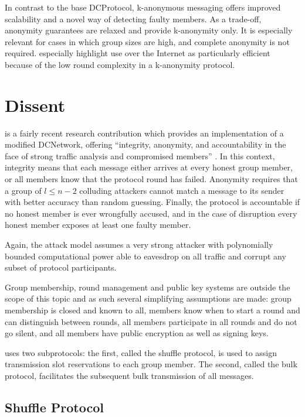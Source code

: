 In contrast to the base \ac{DCProtocol}, k-anonymous messaging offers improved scalability and
a novel way of detecting faulty members. As a trade-off, anonymity guarantees are relaxed
and provide k-anonymity only. It is especially relevant for cases in which group sizes are high,
and complete anonymity is not required. \citeauthor{von2003k} especially highlight use over the
Internet as particularly efficient because of the low round complexity in a k-anonymity protocol.

\section{Dissent} \label{sec:dissent}

\Dissent is a fairly recent research contribution which provides an implementation of a modified \ac{DCNetwork},
offering ``integrity, anonymity, and accountability in the face of strong traffic analysis and compromised members'' \cite{journals/corr/abs-1004-3057}. In this context, integrity means that each message either
arrives at every honest group member, or all members know that the protocol round has failed. Anonymity
requires that a group of $l \leq n - 2$ colluding attackers cannot match a message to its sender
with better accuracy than random guessing. Finally, the protocol is accountable if no honest member is
ever wrongfully accused, and in the case of disruption every honest member exposes at least one faulty member.


Again, the attack model assumes a very strong attacker with polynomially bounded computational
power able to eavesdrop on all traffic and corrupt any subset of protocol participants.

Group membership, round management and public key systems are outside
the scope of this topic and as such several simplifying assumptions are made: group membership is closed
and known to all, members
know when to start a round and can distinguish between rounds, all members participate in all rounds
and do not go silent, and all members have public encryption as well as signing keys.

\Dissent uses two subprotocols: the first, called the shuffle protocol, is used to assign
transmission slot reservations to each group member. The second, called the bulk protocol,
facilitates the subsequent bulk transmission of all messages.

\subsection{Shuffle Protocol}

